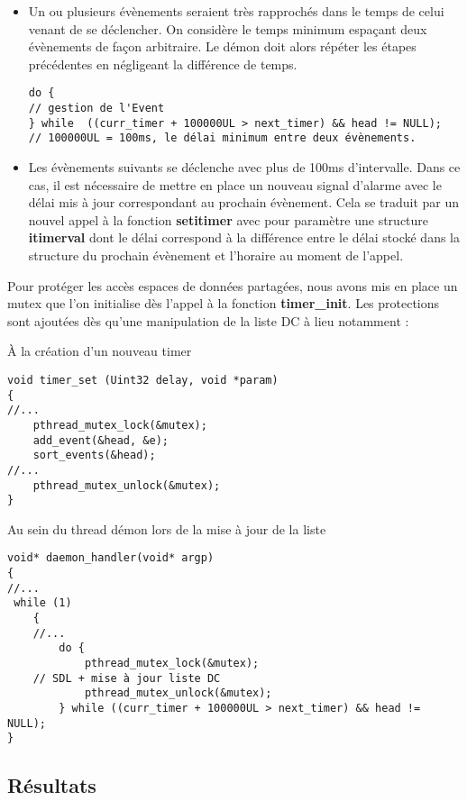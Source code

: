 \documentclass[a4paper]{article}
\begin{document}
\begin{itemize}
\item Un ou plusieurs évènements seraient très rapprochés dans le temps de celui venant de se déclencher. On considère le temps minimum espaçant  deux évènements de façon arbitraire. Le démon doit alors répéter les étapes précédentes en négligeant la différence de temps.
\begin{verbatim}
do { 
// gestion de l'Event
} while  ((curr_timer + 100000UL > next_timer) && head != NULL); 
// 100000UL = 100ms, le délai minimum entre deux évènements.
\end{verbatim}

\item Les évènements suivants se déclenche avec plus de 100ms d'intervalle. Dans ce cas, il est nécessaire de mettre en place un nouveau signal d'alarme avec le délai mis à jour correspondant au prochain évènement. Cela se traduit par un nouvel appel à la fonction \textbf{setitimer} avec pour paramètre une structure \textbf{itimerval} dont le délai correspond à la différence entre le délai stocké dans la structure du prochain évènement et l'horaire au moment de l'appel.
\end{itemize}

Pour protéger les accès espaces de données partagées, nous avons mis en place un mutex que l'on initialise dès l'appel à la fonction \textbf{timer\_init}. Les protections sont ajoutées dès qu'une manipulation de la liste DC à lieu notamment :

À la création d'un nouveau timer
\begin{verbatim}
void timer_set (Uint32 delay, void *param)
{
//...
    pthread_mutex_lock(&mutex);
    add_event(&head, &e);
    sort_events(&head);
//...
    pthread_mutex_unlock(&mutex);
}
\end{verbatim}

Au sein du thread démon lors de la mise à jour de la liste
\begin{verbatim}
void* daemon_handler(void* argp)
{
//...
 while (1)
    {
	//...
        do {
            pthread_mutex_lock(&mutex);
	// SDL + mise à jour liste DC
            pthread_mutex_unlock(&mutex);
        } while ((curr_timer + 100000UL > next_timer) && head != NULL);
}
\end{verbatim}

\subsection{Résultats}
\end{document}
